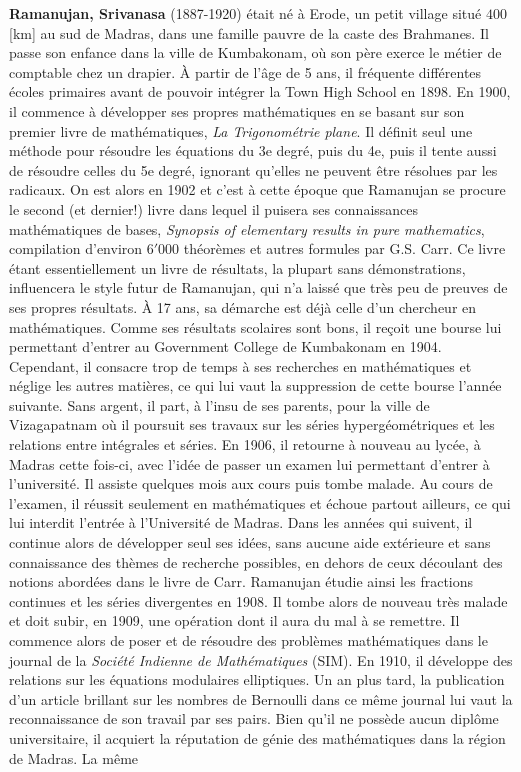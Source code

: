 \textbf{Ramanujan, Srivanasa} (1887-1920) était né à Erode, un petit village situé $400$ [km] au sud de Madras, dans une famille pauvre de la caste des Brahmanes. Il passe son enfance dans la ville de Kumbakonam, où son père exerce le métier de comptable chez un drapier. À partir de l'âge de 5 ans, il fréquente différentes écoles primaires avant de pouvoir intégrer la Town High School en 1898. En 1900, il commence à développer ses propres mathématiques en se basant sur son premier livre de mathématiques, \textit{La Trigonométrie plane}. Il définit seul une méthode pour résoudre les équations du 3e degré, puis du 4e, puis il tente aussi de résoudre celles du 5e degré, ignorant qu'elles ne peuvent être résolues par les radicaux. On est alors en 1902 et c'est à cette époque que Ramanujan se procure le second (et dernier!) livre dans lequel il puisera ses connaissances mathématiques de bases, \textit{Synopsis of elementary results in pure mathematics}, compilation d'environ $6'000$ théorèmes et autres formules par G.S. Carr. Ce livre étant essentiellement un livre de résultats, la plupart sans démonstrations, influencera le style futur de Ramanujan, qui n'a laissé que très peu de preuves de ses propres résultats. À 17 ans, sa démarche est déjà celle d'un chercheur en mathématiques. Comme ses résultats scolaires sont bons, il reçoit une bourse lui permettant d'entrer au Government College de Kumbakonam en 1904. Cependant, il consacre trop de temps à ses recherches en mathématiques et néglige les autres matières, ce qui lui vaut la suppression de cette bourse l'année suivante. Sans argent, il part, à l'insu de ses parents, pour la ville de Vizagapatnam où il poursuit ses travaux sur les séries hypergéométriques et les relations entre intégrales et séries. En 1906, il retourne à nouveau au lycée, à Madras cette fois-ci, avec l'idée de passer un examen lui permettant d'entrer à l'université. Il assiste quelques mois aux cours puis tombe malade. Au cours de l'examen, il réussit seulement en mathématiques et échoue partout ailleurs, ce qui lui interdit l'entrée à l'Université de Madras. Dans les années qui suivent, il continue alors de développer seul ses idées, sans aucune aide extérieure et sans connaissance des thèmes de recherche possibles, en dehors de ceux découlant des notions abordées dans le livre de Carr. Ramanujan étudie ainsi les fractions continues et les séries divergentes en 1908. Il tombe alors de nouveau très malade et doit subir, en 1909, une opération dont il aura du mal à se remettre. Il commence alors de poser et de résoudre des problèmes mathématiques dans le journal de la \textit{Société Indienne de Mathématiques} (SIM). En 1910, il développe des relations sur les équations modulaires elliptiques. Un an plus tard, la publication d'un article brillant sur les nombres de Bernoulli dans ce même journal lui vaut la reconnaissance de son travail par ses pairs. Bien qu'il ne possède aucun diplôme universitaire, il acquiert la réputation de génie des mathématiques dans la région de Madras. La même 